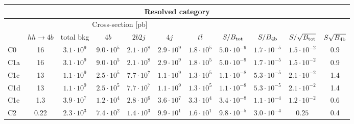 \begin{tabular}{|l|cc|cccc|cccc|}
  \hline
\multicolumn{11}{|c|}{Resolved category}\\
\hline
&  \multicolumn{6}{c|}{Cross-section [pb]} &  &  & &  \\
   &  $hh\to 4b$ &  total bkg  &   $4b$    &  $2b2j$   &   $4j$    &
$t\bar{t}$ &
$S/B_{\rm tot}$ & $S/B_{\rm 4b}$ & $S/\sqrt{B_{\rm tot}}$ & $S\sqrt{B_{\rm 4b}}$ \\
  \hline
  \hline
 C0    & 16  &   $3.1\cdot 10^9$   & $9.0\cdot 10^5$ & $2.1\cdot 10^8$ & $2.9\cdot 10^9$ & $1.8\cdot 10^5$ &   $5.0\cdot 10^{-9}$   & $1.7\cdot 10^{-5}$ &   $1.5\cdot 10^{-2}$   & 0.9 \\
 C1a   & 16  &   $3.1\cdot 10^9$   & $9.0\cdot 10^5$ & $2.1\cdot 10^8$ & $2.9\cdot 10^9$ & $1.8\cdot 10^5$ &   $5.0\cdot 10^{-9}$   & $1.7\cdot 10^{-5}$  &   $1.5\cdot 10^{-2}$   & 0.9 \\
 C1c   & 13  &   $1.1\cdot 10^9$   & $2.5\cdot 10^5$ & $7.7\cdot 10^7$ & $1.1\cdot 10^9$ & $1.3\cdot 10^5$ &   $1.1\cdot 10^{-8}$   & $5.3\cdot 10^{-5}$  &   $2.1\cdot 10^{-2}$   & 1.4  \\
 C1d   & 13 &   $1.1\cdot 10^9 $  & $2.5\cdot 10^5$ & $7.7\cdot 10^7$ & $1.1\cdot 10^9$ & $1.3\cdot 10^5$  &   $1.1\cdot 10^{-8}$   & $5.3\cdot 10^{-5}$  &   $2.1\cdot 10^{-2}$   & 1.4\\
 C1e   & 1.3  &   $3.9\cdot 10^7$   & $1.2\cdot 10^4$ & $2.8\cdot 10^6$ & $3.6\cdot 10^7$ & $3.3\cdot 10^4$  &   $3.4\cdot 10^{-8}$   & $1.1\cdot 10^{-4}$ &   $1.2\cdot 10^{-2}$   & 0.6\\
 C2    & 0.22  &   $2.3\cdot 10^3$   & $7.4\cdot 10^2$ & $1.4\cdot 10^3$ & $9.9\cdot 10^1$ & $1.6\cdot 10^1$  &   $9.8\cdot 10^{-5}$   & $3.0\cdot 10^{-4}$  &  $0.25$   & 0.4 \\
\hline
\end{tabular}
